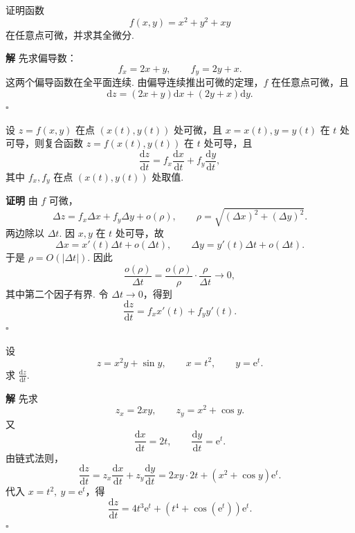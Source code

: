 \documentclass[fontset=fandol]{ctexart}
\newenvironment{proofdetail}{\par\noindent\textbf{证明}\quad}{\hfill$\square$\par\vspace{0.8em}}
\newenvironment{solution}{\par\noindent\textbf{解}\quad}{\hfill$\square$\par\vspace{0.8em}}
\newcommand{\dd}{\mathrm{d}}
\newcommand{\ee}{\mathrm{e}}
\begin{document}
\begin{example}[可微性判断]
证明函数
\[
f(x,y)=x^2+y^2+xy
\]
在任意点可微，并求其全微分.
\end{example}
\begin{solution}
先求偏导数：
\[
f_x=2x+y,\qquad f_y=2y+x.
\]
这两个偏导函数在全平面连续. 由偏导连续推出可微的定理，$f$ 在任意点可微，且
\[
\dd z=(2x+y)\dd x+(2y+x)\dd y.
\]
\end{solution}

\begin{theorem}
设 $z=f(x,y)$ 在点 $(x(t),y(t))$ 处可微，且 $x=x(t),y=y(t)$ 在 $t$ 处可导，则复合函数 $z=f(x(t),y(t))$ 在 $t$ 处可导，且
\[
\frac{\dd z}{\dd t}=f_x\frac{\dd x}{\dd t}+f_y\frac{\dd y}{\dd t},
\]
其中 $f_x,f_y$ 在点 $(x(t),y(t))$ 处取值.
\end{theorem}
\begin{proofdetail}
由 $f$ 可微，
\[
\Delta z=f_x\Delta x+f_y\Delta y+o(\rho),
\qquad \rho=\sqrt{(\Delta x)^2+(\Delta y)^2}.
\]
两边除以 $\Delta t$. 因 $x,y$ 在 $t$ 处可导，故
\[
\Delta x=x'(t)\Delta t+o(\Delta t),\qquad
\Delta y=y'(t)\Delta t+o(\Delta t).
\]
于是 $\rho=O(|\Delta t|)$. 因此
\[
\frac{o(\rho)}{\Delta t}
=\frac{o(\rho)}{\rho}\cdot\frac{\rho}{\Delta t}\to0,
\]
其中第二个因子有界. 令 $\Delta t\to0$，得到
\[
\frac{\dd z}{\dd t}=f_x x'(t)+f_y y'(t).
\]
\end{proofdetail}

\begin{center}
\end{center}

\begin{example}[多元链式法则]
设
\[
z=x^2y+\sin y,\qquad x=t^2,\qquad y=\ee^t.
\]
求 $\frac{\dd z}{\dd t}$.
\end{example}
\begin{solution}
先求
\[
z_x=2xy,\qquad z_y=x^2+\cos y.
\]
又
\[
\frac{\dd x}{\dd t}=2t,\qquad \frac{\dd y}{\dd t}=\ee^t.
\]
由链式法则，
\[
\frac{\dd z}{\dd t}
=z_x\frac{\dd x}{\dd t}+z_y\frac{\dd y}{\dd t}
=2xy\cdot2t+(x^2+\cos y)\ee^t.
\]
代入 $x=t^2,\ y=\ee^t$，得
\[
\frac{\dd z}{\dd t}
=4t^3\ee^t+(t^4+\cos(\ee^t))\ee^t.
\]
\end{solution}
\end{document}
